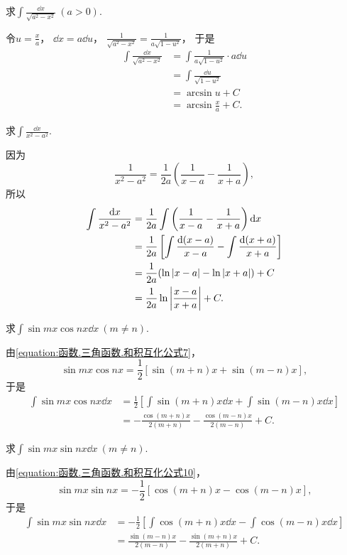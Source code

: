 \begin{example}
求\(\int \frac{\dd{x}}{\sqrt{a^2-x^2}}\ (a>0)\).
\begin{solution}
令\(u=\frac{x}{a}\)，
\(\dd{x}=a\dd{u}\)，
\(\frac{1}{\sqrt{a^2-x^2}}
= \frac{1}{a\sqrt{1-u^2}}\)，
于是\begin{align}
	\int \frac{\dd{x}}{\sqrt{a^2-x^2}}
	&= \int \frac{1}{a\sqrt{1-u^2}} \cdot a\dd{u}
		\nonumber \\
	&= \int \frac{\dd{u}}{\sqrt{1-u^2}}
		\nonumber \\
	&= \arcsin u + C
		\nonumber \\
	&= \arcsin\frac{x}{a} + C.
\end{align}
\end{solution}
\end{example}

\begin{example}
求\(\int \frac{\dd{x}}{x^2 - a^2}\).
\begin{solution}
因为\[
	\frac{1}{x^2 - a^2}
	= \frac{1}{2a} \left(\frac{1}{x-a} - \frac{1}{x+a}\right),
\]
所以\begin{align}
	\int \frac{\dd{x}}{x^2 - a^2}
	&= \frac{1}{2a} \int \left(\frac{1}{x-a} - \frac{1}{x+a}\right) \dd{x}
		\nonumber \\
	&= \frac{1}{2a} \left[ \int \frac{\dd(x-a)}{x-a} - \int \frac{\dd(x+a)}{x+a} \right]
		\nonumber \\
	&= \frac{1}{2a} ( \ln\abs{x-a} - \ln\abs{x+a} ) + C
		\nonumber \\
	&= \frac{1}{2a} \ln\abs{\frac{x-a}{x+a}} + C.
\end{align}
\end{solution}
\end{example}

\begin{example}
求\(\int \sin mx \cos nx \dd{x}\ (m \neq n)\).
\begin{solution}
由\cref{equation:函数.三角函数.和积互化公式7}，
\[
	\sin mx \cos nx
	= \frac12 [\sin(m+n)x + \sin(m-n)x],
\]
于是\begin{align}
	\int \sin mx \cos nx \dd{x}
	&= \frac12 \left[
		\int \sin(m+n)x \dd{x}
		+ \int \sin(m-n)x \dd{x}
	\right]
	\nonumber \\
	&= -\frac{\cos(m+n)x}{2(m+n)}
		- \frac{\cos(m-n)x}{2(m-n)}
		+ C.
\end{align}
\end{solution}
\end{example}

\begin{example}
求\(\int \sin mx \sin nx \dd{x}\ (m \neq n)\).
\begin{solution}
由\cref{equation:函数.三角函数.和积互化公式10}，
\[
	\sin mx \sin nx
	= -\frac12 [\cos(m+n)x - \cos(m-n)x],
\]
于是\begin{align}
	\int \sin mx \sin nx \dd{x}
	&= -\frac12 \left[
		\int \cos(m+n)x \dd{x}
		- \int \cos(m-n)x \dd{x}
	\right]
	\nonumber \\
	&= \frac{\sin(m-n)x}{2(m-n)}
		- \frac{\sin(m+n)x}{2(m+n)}
		+ C.
\end{align}
\end{solution}
\end{example}

